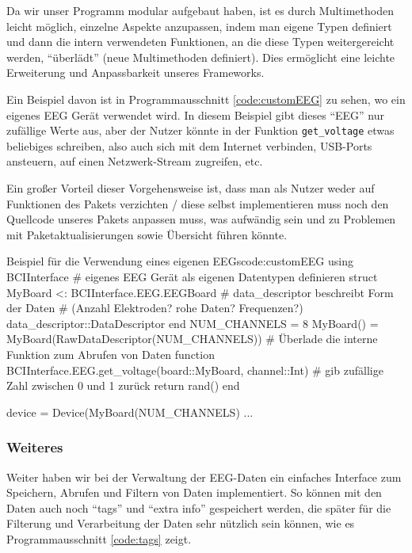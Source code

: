 \documentclass[10pt]{article}
\newcommand{\coderef}[1]{Programmausschnitt \ref{#1}}
\begin{document}
Da wir unser Programm modular aufgebaut haben, ist es durch Multimethoden leicht möglich, einzelne Aspekte anzupassen, indem man eigene Typen definiert und dann die intern verwendeten Funktionen, an die diese Typen weitergereicht werden, \enquote{überlädt} (neue Multimethoden definiert). Dies ermöglicht eine leichte Erweiterung und Anpassbarkeit unseres Frameworks.

Ein Beispiel davon ist in \coderef{code:customEEG} zu sehen, wo ein eigenes EEG Gerät verwendet wird. In diesem Beispiel gibt dieses \enquote{EEG} nur zufällige Werte aus, aber der Nutzer könnte in der Funktion \texttt{get_voltage} etwas beliebiges schreiben, also auch sich mit dem Internet verbinden, USB-Ports ansteuern, auf einen Netzwerk-Stream zugreifen, etc. 

Ein großer Vorteil dieser Vorgehensweise ist, dass man als Nutzer weder auf Funktionen des Pakets verzichten / diese selbst implementieren muss noch den Quellcode unseres Pakets anpassen muss, was aufwändig sein und zu Problemen mit Paketaktualisierungen sowie Übersicht führen könnte. 

\begin{code}{Beispiel für die Verwendung eines eigenen EEGs}{code:customEEG}
using BCIInterface
# eigenes EEG Gerät als eigenen Datentypen definieren
struct MyBoard <: BCIInterface.EEG.EEGBoard
    # data_descriptor beschreibt Form der Daten
    # (Anzahl Elektroden? rohe Daten? Frequenzen?)
    data_descriptor::DataDescriptor
end
NUM_CHANNELS = 8
MyBoard() = MyBoard(RawDataDescriptor(NUM_CHANNELS))
# Überlade die interne Funktion zum Abrufen von Daten
function BCIInterface.EEG.get_voltage(board::MyBoard, channel::Int)
    # gib zufällige Zahl zwischen 0 und 1 zurück
    return rand()
end

device = Device(MyBoard(NUM_CHANNELS)
...
\end{code}

\subsubsection{Weiteres}

Weiter haben wir bei der Verwaltung der EEG-Daten ein einfaches Interface zum Speichern, Abrufen und Filtern von Daten implementiert.
So können mit den Daten auch noch \enquote{tags} und \enquote{extra info} gespeichert werden, die später für die Filterung und Verarbeitung der Daten sehr nützlich sein können, wie es \coderef{code:tags} zeigt.

\end{document}
